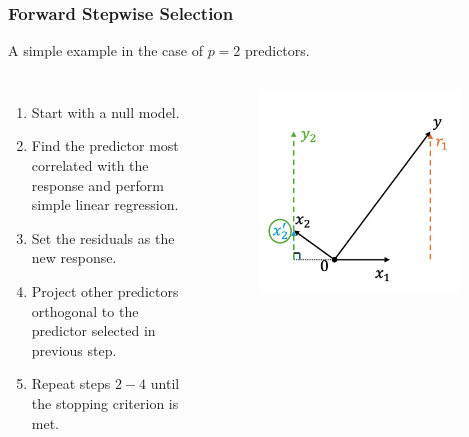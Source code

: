 \begin{frame}
\frametitle{Forward Stepwise Selection}
A simple example in the case of $p=2$ predictors.

\begin{columns}
    \begin{enumerate}
        \item Start with a null model.
        \item Find the predictor most correlated with the response and perform simple linear regression.
        \item Set the residuals as the new response.
        \item Project other predictors orthogonal to the predictor selected in previous step.
        \item Repeat steps $2-4$ until the stopping criterion is met.
    \end{enumerate}
    
    \begin{figure}[!htbp]
        \begin{center}
            \includegraphics[width=0.95\textwidth]{img/FStepR/5.jpeg}
        \end{center}
    \end{figure}
    \end{columns}
\end{frame}

